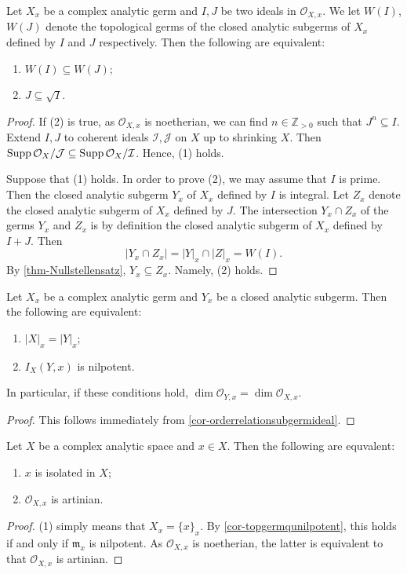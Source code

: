 \begin{corollary}\label{cor-orderrelationsubgermideal}
    Let $X_x$ be a complex analytic germ and $I,J$ be two ideals in $\mathcal{O}_{X,x}$. We let $W(I)$, $W(J)$ denote the topological germs of the closed analytic subgerms of $X_x$ defined by $I$ and $J$ respectively.
    Then the following are equivalent:
    \begin{enumerate}
        \item $W(I)\subseteq W(J)$;
        \item $J\subseteq \sqrt{I}$.
    \end{enumerate}
\end{corollary}
\begin{proof}
    If (2) is true, as $\mathcal{O}_{X,x}$ is noetherian, we can find $n\in \mathbb{Z}_{>0}$ such that $J^n\subseteq I$. Extend $I,J$ to coherent ideals $\mathcal{I},\mathcal{J}$ on $X$ up to shrinking $X$.
    Then $\operatorname{Supp} \mathcal{O}_X/\mathcal{J}\subseteq \operatorname{Supp} \mathcal{O}_X/\mathcal{I}$. Hence, (1) holds.

    Suppose that (1) holds. In order to prove (2), we may assume that $I$ is prime. Then the closed analytic subgerm  $Y_x$ of $X_x$ defined by $I$ is integral. Let $Z_x$ denote the closed analytic subgerm of $X_x$ defined by $J$. The intersection $Y_x\cap Z_x$ of the germs $Y_x$ and $Z_x$ is by definition the closed analytic subgerm of $X_x$ defined by $I+J$. Then
    \[
        |Y_x\cap Z_x|=|Y|_x\cap |Z|_x= W(I).  
    \]
    By \cref{thm-Nullstellensatz}, $Y_x\subseteq Z_x$. Namely, (2) holds.
\end{proof}
\begin{corollary}\label{cor-topgermqunilpotent}
    Let $X_x$ be a complex analytic germ and $Y_x$ be a closed analytic subgerm. Then the following are equivalent:
    \begin{enumerate}
        \item $|X|_x=|Y|_x$;
        \item $I_X(Y,x)$ is nilpotent.
    \end{enumerate}
    In particular, if these conditions hold, $\dim \mathcal{O}_{Y,x}=\dim \mathcal{O}_{X,x}$. 
\end{corollary}
\begin{proof}
    This follows immediately from \cref{cor-orderrelationsubgermideal}.
\end{proof}

\begin{corollary}\label{cor-isolatedpointartin}
    Let $X$ be a complex analytic space and $x\in X$. Then the following are equvalent:
    \begin{enumerate}
        \item $x$ is isolated in $X$;
        \item $\mathcal{O}_{X,x}$ is artinian.
    \end{enumerate}
\end{corollary}
\begin{proof}
    (1) simply means that $X_x=\{x\}_x$. By \cref{cor-topgermqunilpotent}, this holds if and only if $\mathfrak{m}_x$ is nilpotent. As $\mathcal{O}_{X,x}$ is noetherian, the latter is equivalent to that $\mathcal{O}_{X,x}$ is artinian.
\end{proof}


